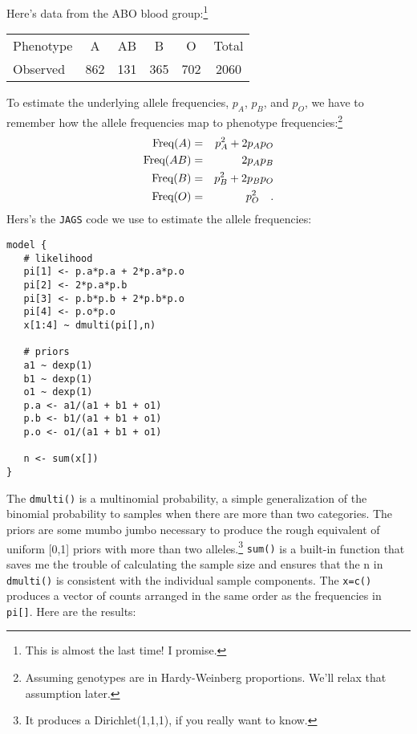 Here's data from the ABO blood group:\footnote{This is almost the last
time! I promise.}
\begin{center}
\begin{tabular}{l|ccccc}
\hline\hline
Phenotype &   A &  AB &   B &   O & Total \\
Observed  & 862 & 131 & 365 & 702 & 2060 \\
\hline
\end{tabular}
\end{center}
To estimate the underlying allele frequencies, $p_A$, $p_B$, and
$p_O$, we have to remember how the allele frequencies map to phenotype
frequencies:\footnote{Assuming genotypes are in Hardy-Weinberg
  proportions. We'll relax that assumption later.}
\begin{eqnarray*}
\hbox{Freq}(A) &=& p_A^2 + 2p_Ap_O \\
\hbox{Freq}(AB) &=& 2p_Ap_B \\
\hbox{Freq}(B) &=& p_B^2 + 2p_Bp_O \\
\hbox{Freq}(O) &=& p_O^2 \quad .
\end{eqnarray*}
Hers's the {\tt JAGS} code we use to estimate the allele
frequencies:
\begin{verbatim}
model {
   # likelihood
   pi[1] <- p.a*p.a + 2*p.a*p.o
   pi[2] <- 2*p.a*p.b
   pi[3] <- p.b*p.b + 2*p.b*p.o
   pi[4] <- p.o*p.o
   x[1:4] ~ dmulti(pi[],n)

   # priors
   a1 ~ dexp(1)
   b1 ~ dexp(1)
   o1 ~ dexp(1)
   p.a <- a1/(a1 + b1 + o1)
   p.b <- b1/(a1 + b1 + o1)
   p.o <- o1/(a1 + b1 + o1)

   n <- sum(x[])
}
\end{verbatim}
The {\tt dmulti()} is a multinomial probability, a simple
generalization of the binomial probability to samples when there are
more than two categories. The priors are some mumbo jumbo necessary to
produce the rough equivalent of uniform [0,1] priors with more than
two alleles.\footnote{It produces a Dirichlet(1,1,1), if you really
  want to know.} {\tt sum()} is a built-in function that saves me the
trouble of calculating the sample size and ensures that the n in {\tt
  dmulti()} is consistent with the individual sample components. The
{\tt x=c()} produces a vector of counts arranged in the same order as
the frequencies in {\tt pi[]}. Here are the results:
